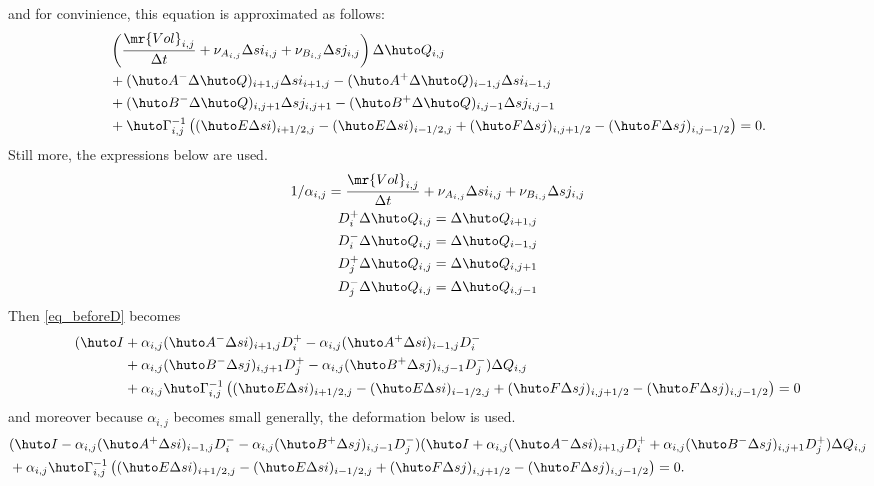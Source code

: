 \documentclass{jsarticle}
\newcommand{\bQ}{\huto Q}
\newcommand{\bI}{\huto I}
\newcommand{\bE}{\huto E}
\newcommand{\bF}{\huto F}
\newcommand{\bA}{\huto A}
\newcommand{\bB}{\huto B}
\newcommand{\bG}{\huto \Gamma}
\newcommand{\Vol}{\mr{Vol}}
\begin{document}
and for convinience, this equation is approximated as follows:
\begin{gather}
\begin{split}
&\left( \frac{\Vol _{i,j}}{\Delta t} + \nu _{A_{i,j}}\Delta si_{i,j} + \nu _{B_{i,j  }}\Delta sj_{i,j  }\right) \Delta \bQ _{i,j}\\
&+ (\bA^-\Delta \bQ)_{i+1,j}\Delta si_{i+1,j} - (\bA^+\Delta \bQ)_{i-1,j}\Delta si_{i-1,j}\\
&+ (\bB^-\Delta \bQ)_{i,j+1}\Delta sj_{i,j+1} - (\bB^+\Delta \bQ)_{i,j-1}\Delta sj_{i,j-1}\\
&+ \bG ^{-1} _{i,j} \left( (\bE \Delta si)_{i+1/2,j} - (\bE \Delta si)_{i-1/2,j}+  (\bF \Delta sj)_{i,j+1/2} - (\bF \Delta sj)_{i,j-1/2} \right) =0.
\end{split} \label{eq_beforeD}
\end{gather}
Still more, the expressions below are used.
\begin{gather}
1/\alpha _{i,j}=\frac{\Vol _{i,j}}{\Delta t} + \nu _{A_{i,j}}\Delta si_{i,j} + \nu _{B_{i,j  }}\Delta sj_{i,j  }\\
D_i^+ \Delta \bQ_{i,j} = \Delta \bQ_{i+1,j}\\
D_i^- \Delta \bQ_{i,j} = \Delta \bQ_{i-1,j}\\
D_j^+ \Delta \bQ_{i,j} = \Delta \bQ_{i,j+1}\\
D_j^- \Delta \bQ_{i,j} = \Delta \bQ_{i,j-1}
\end{gather}
Then \eqref{eq_beforeD} becomes
\begin{gather}
\begin{split}
(\bI
&+ \alpha_{i,j}(\bA^-\Delta si)_{i+1,j}D_i^+ - \alpha_{i,j}(\bA^+\Delta si)_{i-1,j}D_i^-\\
&+ \alpha_{i,j}(\bB^-\Delta sj)_{i,j+1}D_j^+ - \alpha_{i,j}(\bB^+\Delta sj)_{i,j-1}D_j^-)\Delta Q_{i,j}\\
&+ \alpha_{i,j}\bG ^{-1} _{i,j} \left( (\bE \Delta si)_{i+1/2,j} - (\bE \Delta si)_{i-1/2,j}+  (\bF \Delta sj)_{i,j+1/2} - (\bF \Delta sj)_{i,j-1/2} \right) =0
\end{split} \label{eq_beforeD}
\end{gather}
and moreover because $\alpha _{i,j}$ becomes small generally, the deformation below is used.
\begin{gather}
\begin{split}
&(\bI -\alpha_{i,j}(\bA^+\Delta si)_{i-1,j}D_i^- -\alpha_{i,j}(\bB^+\Delta sj)_{i,j-1}D_j^-)(\bI+\alpha_{i,j}(\bA^-\Delta si)_{i+1,j}D_i^+ +\alpha_{i,j}(\bB^-\Delta sj)_{i,j+1}D_j^+)\Delta Q_{i,j}\\
&+ \alpha_{i,j}\bG ^{-1} _{i,j} \left( (\bE \Delta si)_{i+1/2,j} - (\bE \Delta si)_{i-1/2,j}+  (\bF \Delta sj)_{i,j+1/2} - (\bF \Delta sj)_{i,j-1/2} \right) =0.
\end{split} 
\end{gather}
\end{document}
